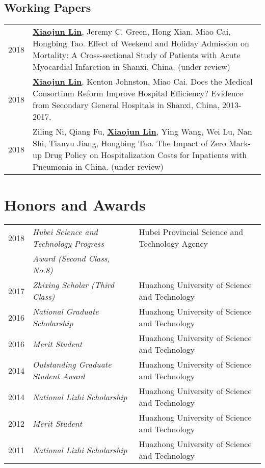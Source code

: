 \documentclass[a4paper,10pt]{article}
\begin{document}
\subsection*{Working Papers}
\begin{longtable}{r p{13cm}}

2018 & \underline{\textbf{Xiaojun Lin}}, Jeremy C. Green, Hong Xian, Miao Cai, Hongbing Tao. Effect of Weekend and Holiday Admission on Mortality: A Cross-sectional Study of Patients with Acute Myocardial Infarction in Shanxi, China. (under review)\\[5pt]

2018 & \underline{\textbf{Xiaojun Lin}}, Kenton Johnston, Miao Cai. Does the Medical Consortium Reform Improve Hospital Efficiency? Evidence from Secondary General Hospitals in Shanxi, China, 2013-2017.\\[5pt]

2018 & Ziling Ni, Qiang Fu, \underline{\textbf{Xiaojun Lin}}, Ying Wang, Wei Lu, Nan Shi, Tianyu Jiang, Hongbing Tao. The Impact of Zero Mark-up Drug Policy on Hospitalization Costs for Inpatients with Pneumonia in China. (under review)\\[5pt]

\end{longtable}


\section{Honors and Awards}
\begin{tabular}{rll}
2018 &  \textit{Hubei Science and Technology Progress} & Hubei Provincial Science and Technology Agency\\
& \textit{Award (Second Class, No.8)} & \\
2017 & \textit{Zhixing Scholar (Third Class)} & Huazhong University of Science and Technology\\
2016 & \textit{National Graduate Scholarship} & Huazhong University of Science and Technology\\
2016 & \textit{Merit Student} &  Huazhong University of Science and Technology\\
2014 & 	\textit{Outstanding Graduate Student Award} & Huazhong University of Science and Technology\\
2014 & 	\textit{National Lizhi Scholarship} &  Huazhong University of Science and Technology\\
2012 & 	\textit{Merit Student} & Huazhong University of Science and Technology\\
2011 & 	\textit{National Lizhi Scholarship} & Huazhong University of Science and Technology
\end{tabular}
\end{document}
